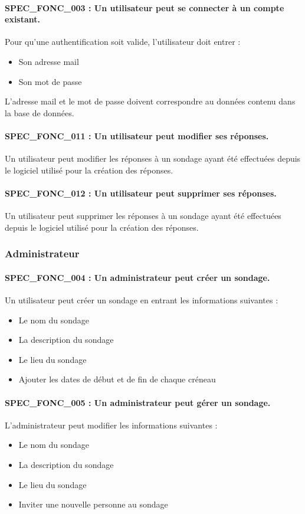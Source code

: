 \documentclass[]{report}
\begin{document}
\paragraph{SPEC\_FONC\_003 : Un utilisateur peut se connecter à un compte existant.}
Pour qu’une authentification soit valide, l’utilisateur doit entrer :
\begin{itemize}
\item Son adresse mail
\item Son mot de passe \end{itemize}
L’adresse mail et le mot de passe doivent correspondre au données contenu dans la base de données.

\paragraph{SPEC\_FONC\_011 : Un utilisateur peut modifier ses réponses.}
Un utilisateur peut modifier les réponses à un sondage ayant été effectuées depuis le logiciel utilisé pour la création des réponses.

\paragraph{SPEC\_FONC\_012 : Un utilisateur peut supprimer ses réponses.}
Un utilisateur peut supprimer les réponses à un sondage ayant été effectuées depuis le logiciel utilisé pour la création des réponses.

\subsubsection{Administrateur}

\paragraph{SPEC\_FONC\_004 : Un administrateur peut créer un sondage.}
Un utilisateur peut créer un sondage en entrant les informations suivantes :
\begin{itemize}
\item Le nom du sondage 
\item La description du sondage
\item Le lieu du sondage
\item Ajouter les dates de début et de fin de chaque créneau  \end{itemize}

\paragraph{SPEC\_FONC\_005 : Un administrateur peut gérer un sondage.}
L’administrateur peut modifier les informations suivantes :
\begin{itemize}
\item Le nom du sondage
\item La description du sondage
\item Le lieu du sondage
\item Inviter une nouvelle personne au sondage \end{itemize}
\end{document}
